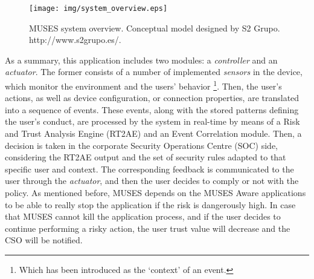 \begin{figure}[ht]
\centering
\texttt{[image: img/system\_overview.eps]}
\caption{MUSES system overview. Conceptual model designed by S2 Grupo.  http://www.s2grupo.es/.\label{fig:system_overview}}
\end{figure}

As a summary, this application includes two modules: a \textit{controller} and an \textit{actuator}. The former consists of a number of implemented \textit{sensors} in the device, which monitor the environment and the users' behavior \footnote{Which has been introduced as the `context' of an event.}. Then, the user's actions, as well as device configuration, or connection properties, are translated into a sequence of events. These events, along with the stored patterns defining the user's conduct, are processed by the system in real-time by means of a Risk and Trust Analysis Engine (RT2AE) and an Event Correlation module. Then, a decision is taken in the corporate Security Operations Centre (SOC) side, considering the RT2AE output and the set of security rules adapted to that specific user and context. The corresponding feedback is communicated to the user through the \textit{actuator}, and then the user decides to comply or not with the policy. As mentioned before, MUSES depends on the MUSES Aware applications to be able to really stop the application if the risk is dangerously high. In case that MUSES cannot kill the application process, and if the user decides to continue performing a risky action, the user trust value will decrease and the CSO will be notified.

